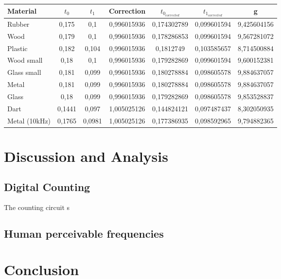 \documentclass[fleqn,11pt]{article}
\begin{document}
\begin{tabular}{lcccccc}
  Material & $t_0$ & $t_1$ & Correction & $t_{0_{corrected}}$ & $t_{1_{corrected}}$ & g\\
  \midrule
  Rubber & 0,175 & 0,1 & 0,996015936 & 0,174302789 & 0,099601594 & 9,425604156\\
  Wood & 0,179 & 0,1 & 0,996015936 & 0,178286853 & 0,099601594 & 9,567281072\\
  Plastic & 0,182 & 0,104 & 0,996015936 & 0,1812749 & 0,103585657 & 8,714500884\\
  Wood small & 0,18 & 0,1 & 0,996015936 & 0,179282869 & 0,099601594 & 9,600152381\\
  Glass small & 0,181 & 0,099 & 0,996015936 & 0,180278884 & 0,098605578 & 9,884637057\\
  Metal & 0,181 & 0,099 & 0,996015936 & 0,180278884 & 0,098605578 & 9,884637057\\
  Glass  & 0,18 & 0,099 & 0,996015936 & 0,179282869 & 0,098605578 & 9,853528837\\
  Dart & 0,1441 & 0,097 & 1,005025126 & 0,144824121 & 0,097487437 & 8,302050935\\
  Metal (10kHz)& 0,1765 & 0,0981 & 1,005025126 & 0,177386935 & 0,098592965 & 9,794882365\\

\end{tabular}
\vspace{0.5cm}




\section{Discussion and Analysis}

\subsection{Digital Counting}
The counting circuit s


\subsection{Human perceivable frequencies}


\section{Conclusion}
\end{document}
